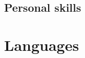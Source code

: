 \documentclass[11pt,a4paper,sans]{moderncv} %
\begin{document}
\subsection{Personal skills}
                 


\section{Languages}
                 

\end{document}
